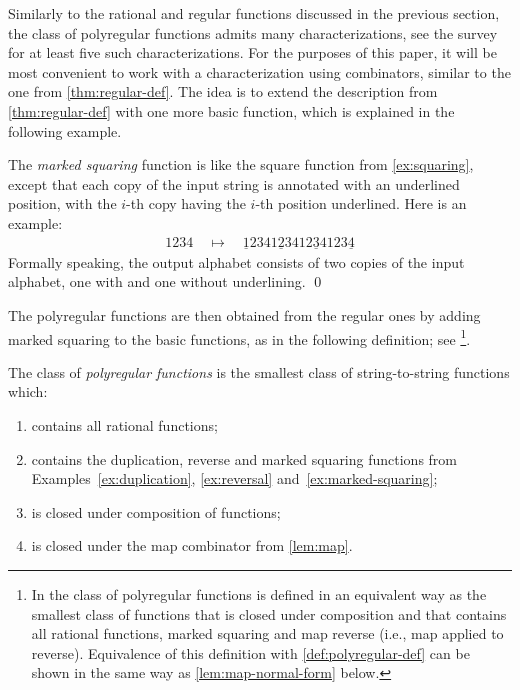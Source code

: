 \documentclass[a4paper,UKenglish,cleveref, autoref, thm-restate]{lipics-v2021}
\begin{document}
Similarly to the rational and regular functions discussed in the previous section, the class of  polyregular functions admits many characterizations, see the survey~\cite{polyregular-survey} for at least five such characterizations. For the purposes of this paper, it will be most convenient to work with a characterization using combinators, similar to the one from \cref{thm:regular-def}. The idea is to extend the description from \cref{thm:regular-def} with one more basic function, which is explained in the following example. 

\begin{example}  \label{ex:marked-squaring} The \emph{marked squaring} function is like the  square function  from \cref{ex:squaring}, except that each copy of the input string is annotated with an underlined position, with the $i$-th copy having the $i$-th position underlined.  Here is an example: 
\begin{align*}
1234 \quad \mapsto \quad \underline{1}234 1\underline{2}34 12\underline{3}4 123\underline{4}
\end{align*}
Formally speaking, the output alphabet consists of two copies of the input alphabet, one with and one without underlining. \qed
\end{example}
The polyregular functions are then obtained from the regular ones by adding marked squaring to the basic functions, as in the following definition; see \cite[Definition~1.2 and Theorem~1.6]{bojanczykPolyregularFunctions2018} \footnote{In \cite[Definition~1.2 and Theorem~1.6]{bojanczykPolyregularFunctions2018} the class of polyregular functions is defined in an equivalent way as the smallest class of functions that is closed under composition and that contains all rational functions, marked squaring and map reverse (i.e., map applied
to reverse). Equivalence of this definition with \cref{def:polyregular-def} can be shown in the same way as \cref{lem:map-normal-form} below.}.
\begin{definition}\label{def:polyregular-def}
    The class of \emph{polyregular functions} is the smallest class of string-to-string functions which: 
    \begin{enumerate}
        \item   contains all rational functions;
        \item \label{item:reg-char-dup-and-rev-marked-square} contains the duplication, reverse and marked squaring functions from Examples~\ref{ex:duplication}, \ref{ex:reversal} and~\ref{ex:marked-squaring};
        \item is closed under composition of functions;
        \item is closed under the map combinator from \cref{lem:map}.
    \end{enumerate}
\end{definition}
\end{document}
